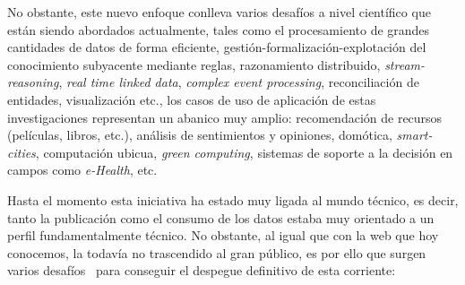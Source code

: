 No obstante, este nuevo enfoque conlleva varios desafíos a nivel científico que están siendo
abordados actualmente, tales como el procesamiento de grandes cantidades de
datos de forma eficiente, gestión-formalización-explotación del conocimiento
subyacente mediante reglas, razonamiento distribuido, \textit{stream-reasoning}, \textit{real
time linked data}, \textit{complex event processing}, reconciliación de entidades,
visualización etc., los casos de uso de aplicación de estas investigaciones representan un abanico muy amplio: recomendación de recursos
(películas, libros, etc.), análisis de sentimientos y opiniones, domótica,
\textit{smart-cities}, computación ubicua, \textit{green computing}, sistemas de soporte a la
decisión en campos como \textit{e-Health}, etc.

Hasta el momento esta iniciativa ha estado muy ligada al mundo técnico, es decir, tanto la publicación como el 
consumo de los datos estaba muy orientado a un perfil fundamentalmente técnico. No obstante, al igual que con la web que hoy conocemos, 
la \wod todavía no trascendido al gran público, es por ello que surgen varios desafíos~\cite{DBLP:journals/semweb/DadzieR11} para 
conseguir el despegue definitivo de esta corriente:

